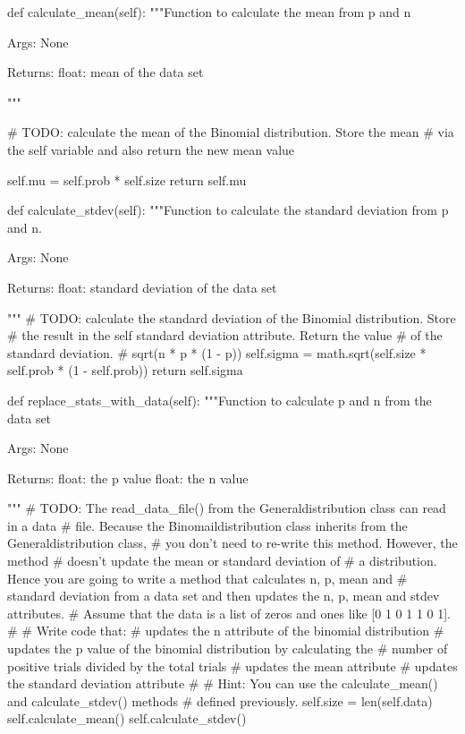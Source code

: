 \begin{python}
		def calculate_mean(self):
			"""Function to calculate the mean from p and n
			
			Args: 
			None
			
			Returns: 
			float: mean of the data set
			
			"""
			
			# TODO: calculate the mean of the Binomial distribution. Store the mean
			#       via the self variable and also return the new mean value
			
			self.mu = self.prob * self.size
			return self.mu
		
		def calculate_stdev(self):
			"""Function to calculate the standard deviation from p and n.
			
			Args: 
			None
			
			Returns: 
			float: standard deviation of the data set
			
			"""
			# TODO: calculate the standard deviation of the Binomial distribution. 	Store
			#       the result in the self standard deviation attribute. Return the 	value
			#       of the standard deviation.
			# sqrt(n * p * (1 - p))
			self.sigma = math.sqrt(self.size * self.prob * (1 - self.prob))
			return self.sigma
		
		def replace_stats_with_data(self):
			"""Function to calculate p and n from the data set
			
			Args: 
			None
			
			Returns: 
			float: the p value
			float: the n value
			
			"""
			# TODO: The read_data_file() from the Generaldistribution class can 	read in a data
			#       file. Because the Binomaildistribution class inherits from the 	Generaldistribution class,
			#       you don't need to re-write this method. However,  the method
			#       doesn't update the mean or standard deviation of
			#       a distribution. Hence you are going to write a method that 	calculates n, p, mean and
			#       standard deviation from a data set and then updates the n, p, 	mean and stdev attributes.
			#       Assume that the data is a list of zeros and ones like [0 1 0 1 	1 0 1]. 
			#
			#       Write code that: 
			#           updates the n attribute of the binomial distribution
			#           updates the p value of the binomial distribution by 	calculating the
			#               number of positive trials divided by the total trials
			#           updates the mean attribute
			#           updates the standard deviation attribute
			#
			#       Hint: You can use the calculate_mean() and calculate_stdev() 	methods
			#           defined previously.
			self.size = len(self.data)
			self.calculate_mean()
			self.calculate_stdev()
			

\end{python}
